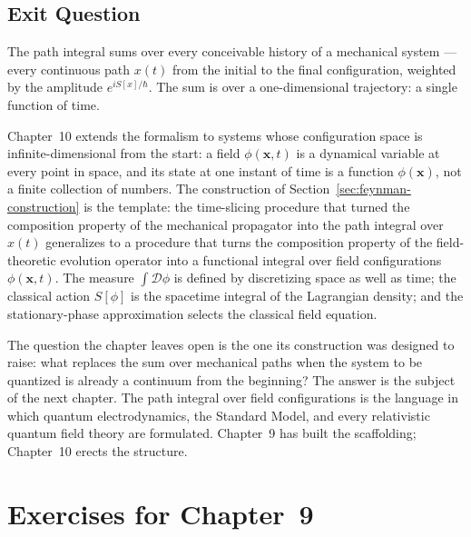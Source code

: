 \subsection{Exit Question}

The path integral sums over every conceivable history of a mechanical system --- every continuous path $x(t)$ from the initial to the final configuration, weighted by the amplitude $e^{iS[x]/\hbar}$. The sum is over a one-dimensional trajectory: a single function of time.

Chapter~10 extends the formalism to systems whose configuration space is infinite-dimensional from the start: a field $\phi(\bm x, t)$ is a dynamical variable at every point in space, and its state at one instant of time is a function $\phi(\bm x)$, not a finite collection of numbers. The construction of Section~\ref{sec:feynman-construction} is the template: the time-slicing procedure that turned the composition property of the mechanical propagator into the path integral over $x(t)$ generalizes to a procedure that turns the composition property of the field-theoretic evolution operator into a functional integral over field configurations $\phi(\bm x, t)$. The measure $\int\mathcal{D}\phi$ is defined by discretizing space as well as time; the classical action $S[\phi]$ is the spacetime integral of the Lagrangian density; and the stationary-phase approximation selects the classical field equation.

The question the chapter leaves open is the one its construction was designed to raise: what replaces the sum over mechanical paths when the system to be quantized is already a continuum from the beginning? The answer is the subject of the next chapter. The path integral over field configurations is the language in which quantum electrodynamics, the Standard Model, and every relativistic quantum field theory are formulated. Chapter~9 has built the scaffolding; Chapter~10 erects the structure.


\section{Exercises for Chapter~9}

